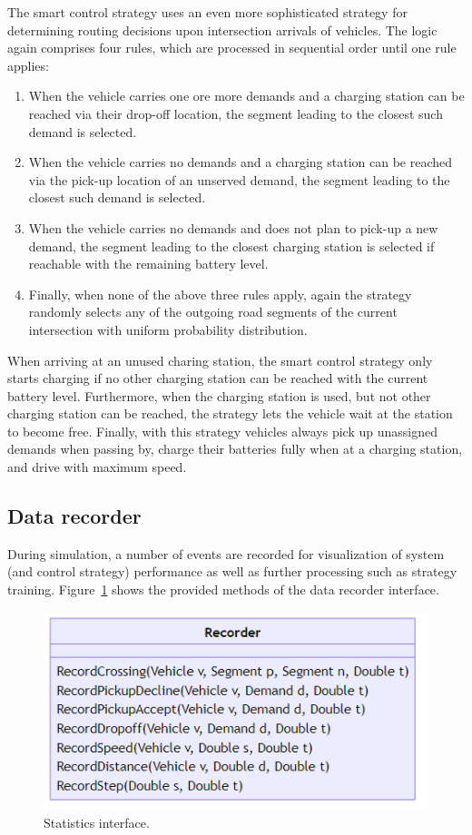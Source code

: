 \documentclass[a4paper,twoside]{article}
\begin{document}
	The smart control strategy uses an even more sophisticated strategy for determining routing decisions upon intersection arrivals of vehicles.
	The logic again comprises four rules, which are processed in sequential order until one rule applies:
	\begin{enumerate}
		\item When the vehicle carries one ore more demands and a charging station can be reached via their drop-off location, the segment leading to the closest such demand is selected.
		\item When the vehicle carries no demands and a charging station can be reached via the pick-up location of an unserved demand, the segment leading to the closest such demand is selected.
		\item When the vehicle carries no demands and does not plan to pick-up a new demand, the segment leading to the closest charging station is selected if reachable with the remaining battery level.
		\item Finally, when none of the above three rules apply, again the strategy randomly selects any of the outgoing road segments of the current intersection with uniform probability distribution.
	\end{enumerate}
	When arriving at an unused charing station, the smart control strategy only starts charging if no other charging station can be reached with the current battery level.
	Furthermore, when the charging station is used, but not other charging station can be reached, the strategy lets the vehicle wait at the station to become free.
	Finally, with this strategy vehicles always pick up unassigned demands when passing by, charge their batteries fully when at a charging station, and drive with maximum speed.
	
	\subsection{Data recorder}
	\label{sec:statistics-interface}
	
	During simulation, a number of events are recorded for visualization of system (and control strategy) performance as well as further processing such as strategy training.
	Figure~\ref{fig:statistics-interface} shows the provided methods of the data recorder interface.
	
	\begin{figure}[!ht]
		\centering
		\includegraphics[scale=0.4]{../../diagrams/statistics/classes-v2.png}
		\caption{Statistics interface.}
		\label{fig:statistics-interface}
	\end{figure}
	
\end{document}
